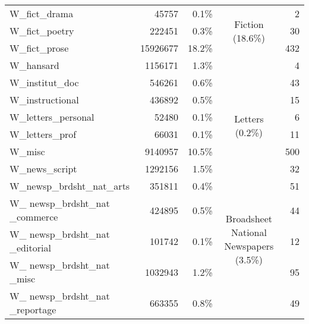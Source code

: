 \begin{table}[Ht]
\begin{tabular}{lrrcr}
        W\_fict\_drama                     & 45757    & 0.1\%   & \multirow{3}{*}{\parbox{2.1cm}{Fiction (18.6\%)}}                       & 2     \\
        W\_fict\_poetry                    & 222451   & 0.3\%   &                                                         & 30    \\
        W\_fict\_prose                     & 15926677 & 18.2\%  &                                                         & 432   \\ \cline{4-4}
        W\_hansard                         & 1156171  & 1.3\%   &                                                         & 4     \\
        W\_institut\_doc                   & 546261   & 0.6\%   &                                                         & 43    \\
        W\_instructional                   & 436892   & 0.5\%   &                                                         & 15    \\ \cline{4-4}
        W\_letters\_personal               & 52480    & 0.1\%   & \multirow{2}{*}{\parbox{2.1cm}{Letters (0.2\%)}}                        & 6     \\
        W\_letters\_prof                   & 66031    & 0.1\%   &                                                         & 11    \\ \cline{4-4}
        W\_misc                            & 9140957  & 10.5\%  &                                                         & 500   \\ \cline{4-4}
        W\_news\_script                    & 1292156  & 1.5\%   & \multirow{9}{*}{\parbox{2.1cm}{Broadsheet National Newspapers (3.5\%)}} & 32    \\
        W\_newsp\_brdsht\_nat\_arts        & 351811   & 0.4\%   &                                                         & 51    \\
        W\_ newsp\_brdsht\_nat \_commerce  & 424895   & 0.5\%   &                                                         & 44    \\
        W\_ newsp\_brdsht\_nat \_editorial & 101742   & 0.1\%   &                                                         & 12    \\
        W\_ newsp\_brdsht\_nat \_misc      & 1032943  & 1.2\%   &                                                         & 95    \\
        W\_ newsp\_brdsht\_nat \_reportage & 663355   & 0.8\%   &                                                         & 49    \\

\end{tabular}
\end{table}
